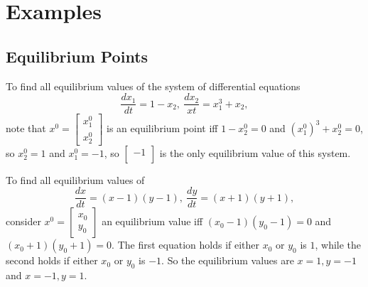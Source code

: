 \section{Examples}

\subsection{Equilibrium Points}
\begin{example}
    To find all equilibrium values of the system of differential equations \[
    \frac{dx_1}{dt}=1-x_2,\ \frac{dx_2}{xt}=x_1^3+x_2,
    \] note that $x^0=
    \begin{bmatrix}
        x_1^0\\x_2^0
    \end{bmatrix}$ is an equilibrium point iff $1-x_2^0=0$ and $(x_1^0)^3+x_2^0=0$, so $x_2^0=1$ and $x_1^0=-1$, so $
    \begin{bmatrix}
        -1\\
    \end{bmatrix}$ is the only equilibrium value of this system.
\end{example}
\begin{example}
    To find all equilibrium values of \[
        \frac{dx}{dt}=(x-1)(y-1), \ \frac{dy}{dt}=(x+1)(y+1),
    \] consider $x^0=
    \begin{bmatrix}
        x_0\\y_0
    \end{bmatrix}$ an equilibrium value iff $(x_0-1)(y_0-1)=0$ and $(x_0+1)(y_0+1)=0$. The first equation holds if either $x_0$ or $y_0$ is $1$, while the second holds if either $x_0$ or $y_0$ is $-1$. So the equilibrium values are $x=1,y=-1$ and $x=-1,y=1$.
\end{example}

